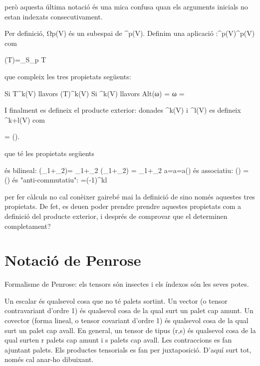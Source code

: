però aquesta última notació és una mica confusa quan els arguments inicials no estan indexats consecutivament.

Per definició, Ωp(V) és un subespai de ^p(V). Definim una aplicació :^p(V)\to{}^p(V) com

    (T)=\sum_{\sigma\in S_p} \sgn\sigma\cdot T\circ\sigma 

que compleix les tres propietats següents:

    Si T\in{}^k(V) llavors (T)\in\Omega^k(V)
    Si \omega\in\Omega^k(V) llavors Alt(ω) = ω
    \circ{}= 

I finalment es defineix el producte exterior: donades \omega\in\Omega^k(V) i \eta\in\Omega^l(V) es defineix \omega\wedge\eta\in\Omega^{k+l}(V) com

    \omega\wedge\eta = (\omega\otimes\eta). 

que té les propietats següents

    és bilineal:
        (\omega_1+\omega_2)\wedge\eta = \omega_1\wedge\eta+\omega_2\wedge\eta
        \omega\wedge(\eta_1+\eta_2) = \omega\wedge\eta_1+\omega\wedge\eta_2
        a\omega\wedge\eta=\omega\wedge a\eta=a(\omega\wedge\eta) 
    és associatiu: \omega\wedge(\eta\wedge\theta) = (\omega\wedge\eta)\wedge\theta
    és "anti-commutatiu": \omega\wedge\eta=(-1)^{kl}\eta\wedge\omega 

per fer càlculs no cal conèixer gairebé mai la definició de \wedge sino només aquestes tres propietats. De fet, es deuen poder prendre prendre aquestes propietats com a definició del producte exterior, i després de comprovar que el determinen completament?




\section{Notació de Penrose}

Formalisme de Penrose: els tensors són insectes i els índexos són les seves potes.

Un escalar és qualsevol cosa que no té palets sortint. Un vector (o tensor contravariant d'ordre 1) és qualsevol cosa de la qual surt un palet cap amunt. Un covector (forma lineal, o tensor covariant d'ordre 1) és qualsevol cosa de la qual surt un palet cap avall. En general, un tensor de tipus (r,s) és qualsevol cosa de la qual surten r palets cap amunt i s palets cap avall. Les contraccions es fan ajuntant palets. Els productes tensorials es fan per juxtaposició. D'aquí surt tot, només cal anar-ho dibuixant.


